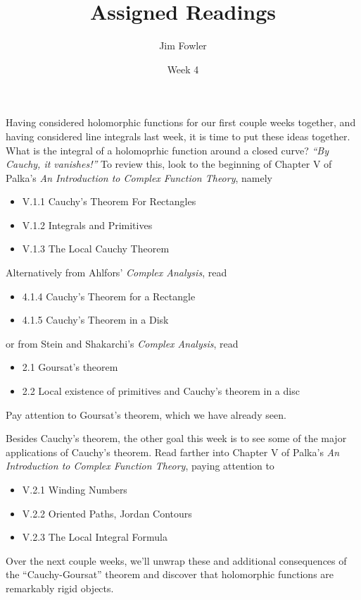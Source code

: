 \documentclass{homework}
\author{Jim Fowler}
\title{Assigned Readings}
\date{Week 4}
\begin{document}
\maketitle

Having considered holomorphic functions for our first couple weeks
together, and having considered line integrals last week, it is time
to put these ideas together.  What is the integral of a holomoprhic
function around a closed curve?  \textit{``By Cauchy, it vanishes!''}
To review this, look to the beginning of Chapter V of Palka's
\textit{An Introduction to Complex Function Theory}, namely
\begin{itemize}
\item V.1.1 Cauchy's Theorem For Rectangles
\item V.1.2 Integrals and Primitives
\item V.1.3 The Local Cauchy Theorem
\end{itemize}
Alternatively from Ahlfors' \textit{Complex Analysis}, read
\begin{itemize}
\item 4.1.4 Cauchy's Theorem for a Rectangle
\item 4.1.5 Cauchy's Theorem in a Disk
\end{itemize}
or from Stein and Shakarchi's \textit{Complex Analysis}, read
\begin{itemize}
\item 2.1 Goursat's theorem
\item 2.2 Local existence of primitives and Cauchy's theorem in a disc
\end{itemize}
Pay attention to Goursat's theorem, which we have already seen.

Besides Cauchy's theorem, the other goal this week is to see some of
the major applications of Cauchy's theorem.  Read farther into Chapter
V of Palka's \textit{An Introduction to Complex Function Theory},
paying attention to
\begin{itemize}
\item V.2.1 Winding Numbers
\item V.2.2 Oriented Paths, Jordan Contours
\item V.2.3 The Local Integral Formula
\end{itemize}
Over the next couple weeks, we'll unwrap these and additional
consequences of the ``Cauchy-Goursat'' theorem and discover that
holomorphic functions are remarkably rigid objects.
\end{document}
